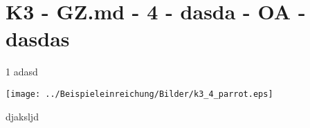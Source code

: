 \section{K3 - GZ.md - 4 - dasda - OA - dasdas}

\begin{langesbeispiel} \item[1] %
adasd 

\texttt{[image: ../Beispieleinreichung/Bilder/k3\_4\_parrot.eps]}

djaksljd
\end{langesbeispiel}